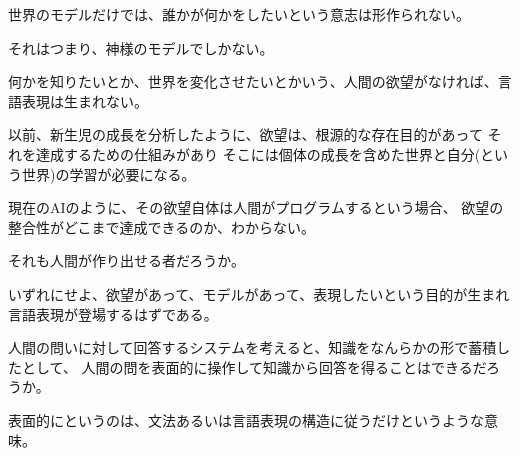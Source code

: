 \documentclass[10pt, oneside]{jarticle}   	%
\begin{document}
世界のモデルだけでは、誰かが何かをしたいという意志は形作られない。

それはつまり、神様のモデルでしかない。

何かを知りたいとか、世界を変化させたいとかいう、人間の欲望がなければ、言語表現は生まれない。

以前、新生児の成長を分析したように、欲望は、根源的な存在目的があって
それを達成するための仕組みがあり
そこには個体の成長を含めた世界と自分(という世界)の学習が必要になる。

現在のAIのように、その欲望自体は人間がプログラムするという場合、
欲望の整合性がどこまで達成できるのか、わからない。

それも人間が作り出せる者だろうか。

いずれにせよ、欲望があって、モデルがあって、表現したいという目的が生まれ
言語表現が登場するはずである。


人間の問いに対して回答するシステムを考えると、知識をなんらかの形で蓄積したとして、
人間の問を表面的に操作して知識から回答を得ることはできるだろうか。

表面的にというのは、文法あるいは言語表現の構造に従うだけというような意味。
\end{document}
